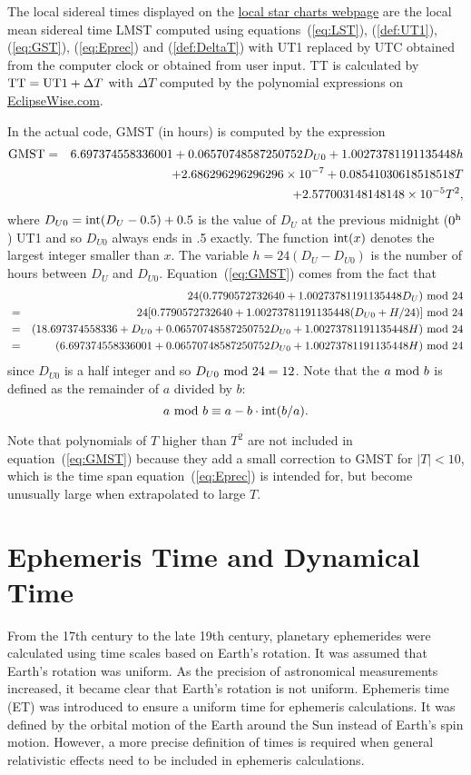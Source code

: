 \documentclass[12pt]{article}
\newcommand \beq {\begin{equation}}
\newcommand \eeq {\end{equation}}
\newcommand \beqn {\begin{eqnarray}}
\newcommand \eeqn {\end{eqnarray}}
\begin{document}
The local sidereal 
times displayed on the \href{../sidereal.html}{local star charts webpage} are the 
local mean sidereal time LMST computed using equations~(\ref{eq:LST}), (\ref{def:UT1}), 
(\ref{eq:GST}), (\ref{eq:Eprec}) and (\ref{def:DeltaT}) with UT1 replaced by UTC 
obtained from the computer clock or obtained from user input. 
TT is calculated by ${\rm TT = UT1}+\Delta T$ 
with $\Delta T$ computed by the polynomial expressions on 
\href{http://eclipsewise.com/help/deltatpoly2014.html}{EclipseWise.com}.

In the actual code, GMST (in hours) is computed by the expression 
\beqn
  {\rm GMST} &=& 6.697374558336001 + 0.06570748587250752 D_{U0} 
+ 1.00273781191135448 h \cr 
&& + 2.686296296296296\times 10^{-7} + 0.08541030618518518 T \cr 
&& + 2.577003148148148\times 10^{-5} T^2 ,
\label{eq:GMST}
\eeqn
where $D_{U0} = {\rm int}(D_U - 0.5) + 0.5$ is the value of $D_U$ at the previous 
midnight ($0^{\rm h}$) UT1 and so $D_{U0}$ always ends in .5 exactly. The function 
${\rm int}(x)$ denotes the largest integer smaller than $x$. The variable 
$h=24(D_U-D_{U0})$ 
is the number of hours between $D_U$ and $D_{U0}$. Equation~(\ref{eq:GMST}) comes 
from the fact that
\beqn
  && 24(0.7790572732640 + 1.00273781191135448 D_U)~{\rm mod}~24 \cr
&=& 24[0.7790572732640 + 1.00273781191135448 (D_{U0}+H/24)]~{\rm mod}~24 \cr
&=& (18.697374558336 + D_{U0} + 0.06570748587250752 D_{U0} + 
1.00273781191135448 H)~{\rm mod}~24 \cr
&=& (6.697374558336001 + 0.06570748587250752 D_{U0} + 
1.00273781191135448 H)~{\rm mod}~24 
\eeqn
since $D_{U0}$ is a half integer and so $D_{U0}~{\rm mod}~24=12$. Note that 
the $a~{\rm mod}~b$ is defined as the remainder of $a$ divided by $b$:
\beq
  a~{\rm mod}~b \equiv a - b \cdot {\rm int}(b/a) .
\eeq

Note that polynomials of $T$ higher than $T^2$ are not included in 
equation~(\ref{eq:GMST}) because they add a small correction to 
GMST for $|T|<10$, which is the time span equation~(\ref{eq:Eprec}) is intended for, 
but become unusually large when extrapolated to large $T$.

\section{Ephemeris Time and Dynamical Time}
\label{sec:ET}

From the 17th century to the late 19th century, planetary ephemerides 
were calculated using time scales based on Earth's rotation. It was 
assumed that Earth's rotation was uniform. As the precision of astronomical 
measurements increased, it became clear that Earth's rotation is not uniform. 
Ephemeris time (ET) was introduced to ensure a uniform time for ephemeris calculations.
It was defined by the orbital motion of the Earth 
around the Sun instead of Earth's spin motion. However, a more precise 
definition of times is required when general relativistic effects need to be included 
in ephemeris calculations.
\end{document}
